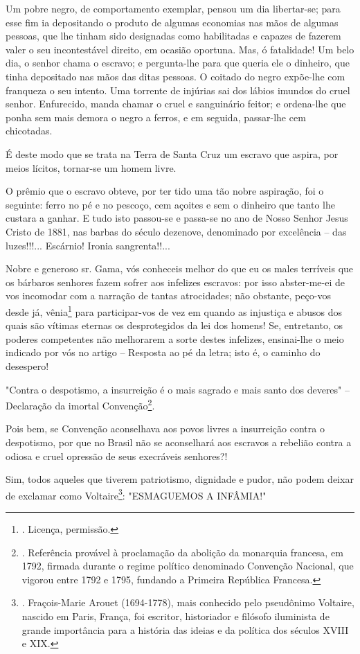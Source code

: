 Um pobre negro, de comportamento exemplar, pensou um dia libertar-se;
para esse fim ia depositando o produto de algumas economias nas mãos de
algumas pessoas, que lhe tinham sido designadas como habilitadas e
capazes de fazerem valer o seu incontestável direito, em ocasião
oportuna. Mas, ó fatalidade! Um belo dia, o senhor chama o escravo; e
pergunta-lhe para que queria ele o dinheiro, que tinha depositado nas
mãos das ditas pessoas. O coitado do negro expõe-lhe com franqueza o seu
intento. Uma torrente de injúrias sai dos lábios imundos do cruel
senhor. Enfurecido, manda chamar o cruel e sanguinário feitor; e
ordena-lhe que ponha sem mais demora o negro a ferros, e em seguida,
passar-lhe cem chicotadas.

É deste modo que se trata na Terra de Santa Cruz um escravo que aspira,
por meios lícitos, tornar-se um homem livre.

O prêmio que o escravo obteve, por ter tido uma tão nobre aspiração, foi
o seguinte: ferro no pé e no pescoço, cem açoites e sem o dinheiro que
tanto lhe custara a ganhar. E tudo isto passou-se e passa-se no ano de
Nosso Senhor Jesus Cristo de 1881, nas barbas do século dezenove,
denominado por excelência -- das luzes!!!... Escárnio! Ironia
sangrenta!!...

Nobre e generoso sr. Gama, vós conheceis melhor do que eu os males
terríveis que os bárbaros senhores fazem sofrer aos infelizes escravos:
por isso abster-me-ei de vos incomodar com a narração de tantas
atrocidades; não obstante, peço-vos desde já, vênia\footnote{. Licença,
  permissão.} para participar-vos de vez em quando as injustiça e abusos
dos quais são vítimas eternas os desprotegidos da lei dos homens! Se,
entretanto, os poderes competentes não melhorarem a sorte destes
infelizes, ensinai-lhe o meio indicado por vós no artigo -- Resposta ao
pé da letra; isto é, o caminho do desespero!

"Contra o despotismo, a insurreição é o mais sagrado e mais santo dos
deveres" -- Declaração da imortal Convenção\footnote{. Referência
  provável à proclamação da abolição da monarquia francesa, em 1792,
  firmada durante o regime político denominado Convenção Nacional, que
  vigorou entre 1792 e 1795, fundando a Primeira República Francesa.}.

Pois bem, se Convenção aconselhava aos povos livres a insurreição contra
o despotismo, por que no Brasil não se aconselhará aos escravos a
rebelião contra a odiosa e cruel opressão de seus execráveis senhores?!

Sim, todos aqueles que tiverem patriotismo, dignidade e pudor, não podem
deixar de exclamar como Voltaire\footnote{. Fraçois-Marie Arouet
  (1694-1778), mais conhecido pelo pseudônimo Voltaire, nascido em
  Paris, França, foi escritor, historiador e filósofo iluminista de
  grande importância para a história das ideias e da política dos
  séculos XVIII e XIX.}:
"ESMAGUEMOS A INFÂMIA!"

